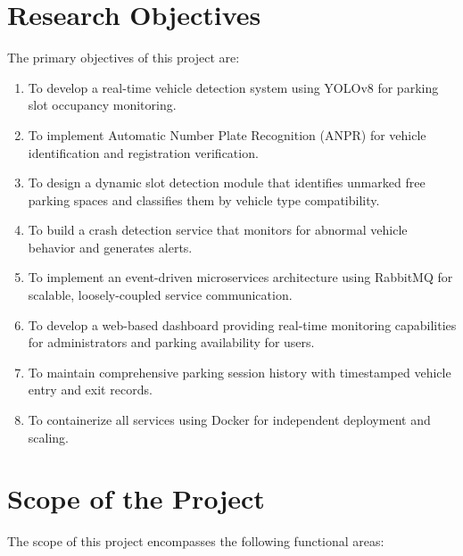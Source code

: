 \documentclass[12pt,a4paper]{report}
\begin{document}
\section{Research Objectives}

The primary objectives of this project are:

\begin{enumerate}
    \item To develop a real-time vehicle detection system using YOLOv8 for parking slot occupancy monitoring.
    \item To implement Automatic Number Plate Recognition (ANPR) for vehicle identification and registration verification.
    \item To design a dynamic slot detection module that identifies unmarked free parking spaces and classifies them by vehicle type compatibility.
    \item To build a crash detection service that monitors for abnormal vehicle behavior and generates alerts.
    \item To implement an event-driven microservices architecture using RabbitMQ for scalable, loosely-coupled service communication.
    \item To develop a web-based dashboard providing real-time monitoring capabilities for administrators and parking availability for users.
    \item To maintain comprehensive parking session history with timestamped vehicle entry and exit records.
    \item To containerize all services using Docker for independent deployment and scaling.
\end{enumerate}

\section{Scope of the Project}

The scope of this project encompasses the following functional areas:
\end{document}
